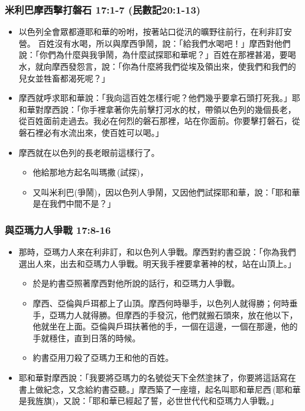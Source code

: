 \subsubsection{米利巴摩西擊打磐石 17:1-7 (民數記20:1-13)}
\begin{itemize} 
\itemsep-.35em
\item 以色列全會眾都遵耶和華的吩咐，按著站口從汛的曠野往前行，在利非訂安營。
百姓沒有水喝，所以與摩西爭鬧，說：「給我們水喝吧！」摩西對他們說：「你們為什麼與我爭鬧，為什麼試探耶和華呢？」百姓在那裡甚渴，要喝水，就向摩西發怨言，說：「你為什麼將我們從埃及領出來，使我們和我們的兒女並牲畜都渴死呢？」 
\item 摩西就呼求耶和華說：「我向這百姓怎樣行呢？他們幾乎要拿石頭打死我。」耶和華對摩西說：「你手裡拿著你先前擊打河水的杖，帶領以色列的幾個長老，從百姓面前走過去。我必在何烈的磐石那裡，站在你面前。你要擊打磐石，從磐石裡必有水流出來，使百姓可以喝。」
\item 摩西就在以色列的長老眼前這樣行了。 
\begin{itemize} 
\itemsep-.35em
\item 他給那地方起名叫瑪撒 (試探)，
\item 又叫米利巴(爭鬧)，因以色列人爭鬧，又因他們試探耶和華，說：「耶和華是在我們中間不是？」
\end{itemize}
\end{itemize}

\subsubsection{與亞瑪力人爭戰 17:8-16 }
\begin{itemize} 
\itemsep-.35em
\item 那時，亞瑪力人來在利非訂，和以色列人爭戰。摩西對約書亞說：「你為我們選出人來，出去和亞瑪力人爭戰。明天我手裡要拿著神的杖，站在山頂上。」 
\begin{itemize} 
\itemsep-.35em
\item 於是約書亞照著摩西對他所說的話行，和亞瑪力人爭戰。
\item 摩西、亞倫與戶珥都上了山頂。摩西何時舉手，以色列人就得勝；何時垂手，亞瑪力人就得勝。但摩西的手發沉，他們就搬石頭來，放在他以下，他就坐在上面。亞倫與戶珥扶著他的手，一個在這邊，一個在那邊，他的手就穩住，直到日落的時候。
\item 約書亞用刀殺了亞瑪力王和他的百姓。 
\end{itemize}
\item 耶和華對摩西說：「我要將亞瑪力的名號從天下全然塗抹了，你要將這話寫在書上做紀念，又念給約書亞聽。」摩西築了一座壇，起名叫耶和華尼西 (耶和華是我旌旗)，又說：「耶和華已經起了誓，必世世代代和亞瑪力人爭戰。」
\end{itemize}


